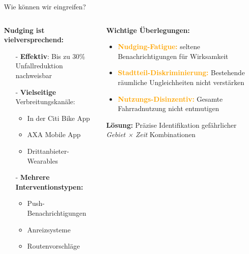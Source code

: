 \documentclass[aspectratio=169,xcolor={usenames,dvipsnames,svgnames,table},10pt,usepdftitle=false,hyperref={bookmarksdepth=3}]{beamer}
\begin{document}
\begin{frame}{Wie können wir eingreifen?}
    \begin{columns}
        \begin{column}{0.5\textwidth}
            \textbf{Nudging ist vielversprechend:}
            
            \begin{itemize}
                \item[-] \textbf{Effektiv}: Bis zu 30\% Unfallreduktion nachweisbar
                \item[-] \textbf{Vielseitige} Verbreitungskanäle:
                \begin{itemize}
                    \item In der Citi Bike App
                    \item AXA Mobile App
                    \item Drittanbieter-Wearables
                \end{itemize}
                \item[-] \textbf{Mehrere Interventionstypen:}
                \begin{itemize}
                    \item Push-Benachrichtigungen
                    \item Anreizsysteme
                    \item Routenvorschläge
                \end{itemize}
            \end{itemize}
        \end{column}
        
        \begin{column}{0.5\textwidth}
            \textbf{Wichtige Überlegungen:}
            \begin{itemize}
                \item \textcolor{orange}{\textbf{Nudging-Fatigue:}} seltene Benachrichtigungen für Wirksamkeit
                \item \textcolor{orange}{\textbf{Stadtteil-Diskriminierung:}} Bestehende räumliche Ungleichheiten nicht verstärken
                \item \textcolor{orange}{\textbf{Nutzungs-Disinzentiv:}} Gesamte Fahrradnutzung nicht entmutigen
            \end{itemize}
            
            \vspace{0.3cm}
            
            \textbf{Lösung:} Präzise Identifikation gefährlicher \textit{Gebiet × Zeit} Kombinationen
        \end{column}
    \end{columns}
\end{frame}
\end{document}
